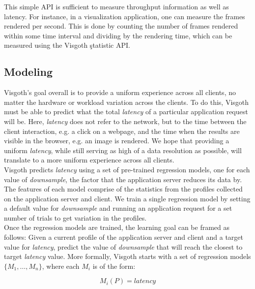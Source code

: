   This simple API is sufficient to measure throughput information as well as
  latency. For instance, in a visualization application, one can measure the
  frames rendered per second. This is done by counting the number of frames
  rendered within some time interval and dividing by the rendering time,
  which can be measured using the Visgoth \c{statistic} API.\\

  \subsection{Modeling}\label{visgoth-ch:modeling}

  Visgoth's goal overall is to provide a uniform experience across all clients,
  no matter the hardware or workload variation across the clients. To do this,
  Visgoth must be able to predict what the total \emph{latency} of a particular
  application request will be. Here, \emph{latency} does not refer to the
  network, but to the time between the client interaction, e.g. a click on a
  webpage, and the time when the results are visible in the browser, e.g. an
  image is rendered. We hope that providing a uniform \emph{latency}, while
  still serving as high of a data resolution as possible, will translate to a
  more uniform experience across all clients.\\

  Visgoth predicts \emph{latency} using a set of pre-trained regression models,
  one for each value of \emph{downsample}, the factor that the application
  server reduces its data by. The features of each model comprise of the
  statistics from the profiles collected on the application server and client.
  We train a single regression model by setting a default value for
  \emph{downsample} and running an application request for a set number of
  trials to get variation in the profiles.\\

  Once the regression models are trained, the learning goal can be framed as
  follows: Given a current profile of the application server and client and a
  target value for \emph{latency}, predict the value of \emph{downsample} that
  will reach the closest to target \emph{latency} value. More formally, Visgoth
  starts with a set of regression models $\{ M_1, \dots, M_n \}$, where each
  $M_i$ is of the form:

  \begin{equation*}
    M_i(P) = latency
  \end{equation*}

